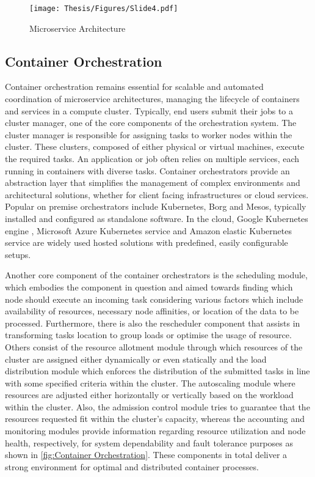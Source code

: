 \captionsetup{justification=centering}
\begin{figure}[h]
\centering
\texttt{[image: Thesis/Figures/Slide4.pdf]}
\caption{\label{fig:Microservice Architecture}Microservice Architecture \cite{r23}}
\end{figure}


\subsection{Container Orchestration}

Container orchestration remains essential for scalable and automated coordination of microservice architectures, managing the lifecycle of containers and services in a compute cluster. Typically, end users submit their jobs to a cluster manager, one of the core components of the orchestration system. The cluster manager is responsible for assigning tasks to worker nodes within the cluster. These clusters, composed of either physical or virtual machines, execute the required tasks. An application or job often relies on multiple services, each running in containers with diverse tasks. Container orchestrators provide an abstraction layer that simplifies the management of complex environments and architectural solutions, whether for client facing infrastructures or cloud services. Popular on premise orchestrators include Kubernetes, Borg and Mesos, typically installed and configured as standalone software. In the cloud, Google Kubernetes engine , Microsoft Azure Kubernetes service  and Amazon elastic Kubernetes service  are widely used hosted solutions with predefined, easily configurable setups. \cite{carrion2022Kubernetes}

Another core component of the container orchestrators is the scheduling module, which embodies the component in question and aimed towards finding which node should execute an incoming task considering various factors which include availability of resources, necessary node affinities, or location of the data to be processed. Furthermore, there is also the rescheduler component that assists in transforming tasks location to group loads or optimise the usage of resource. Others consist of the resource allotment module through which resources of the cluster are assigned either dynamically or even statically and the load distribution module which enforces the distribution of the submitted tasks in line with some specified criteria within the cluster. The autoscaling module where resources are adjusted either horizontally or vertically based on the workload within the cluster. Also, the admission control module tries to guarantee that the resources requested fit within the cluster’s capacity, whereas the accounting and monitoring modules provide information regarding resource utilization and node health, respectively, for system dependability and fault tolerance purposes as shown in \autoref{fig:Container Orchestration}. These components in total deliver a strong environment for optimal and distributed container processes. \cite{carrion2022Kubernetes}


